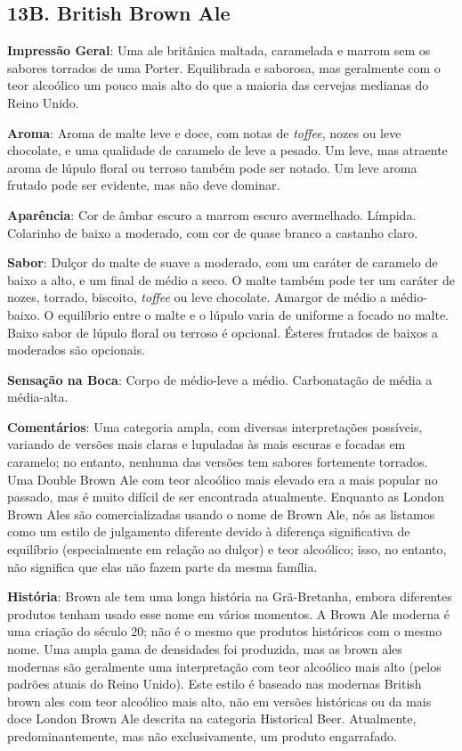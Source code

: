 \subsection*{13B. British Brown Ale}
\textbf{Impressão Geral}: Uma ale britânica maltada, caramelada e marrom sem os sabores torrados de uma Porter. Equilibrada e saborosa, mas geralmente com o teor alcoólico um pouco mais alto do que a maioria das cervejas medianas do Reino Unido.

\textbf{Aroma}: Aroma de malte leve e doce, com notas de \textit{toffee}, nozes ou leve chocolate, e uma qualidade de caramelo de leve a pesado. Um leve, mas atraente aroma de lúpulo floral ou terroso também pode ser notado. Um leve aroma frutado pode ser evidente, mas não deve dominar.

\textbf{Aparência}: Cor de âmbar escuro a marrom escuro avermelhado. Límpida. Colarinho de baixo a moderado, com cor de quase branco a castanho claro.

\textbf{Sabor}: Dulçor do malte de suave a moderado, com um caráter de caramelo de baixo a alto, e um final de médio a seco. O malte também pode ter um caráter de nozes, torrado, biscoito, \textit{toffee} ou leve chocolate. Amargor de médio a médio-baixo. O equilíbrio entre o malte e o lúpulo varia de uniforme a focado no malte. Baixo sabor de lúpulo floral ou terroso é opcional. Ésteres frutados de baixos a moderados são opcionais.

\textbf{Sensação na Boca}: Corpo de médio-leve a médio. Carbonatação de média a média-alta.

\textbf{Comentários}: Uma categoria ampla, com diversas interpretações possíveis, variando de versões mais claras e lupuladas às mais escuras e focadas em caramelo; no entanto, nenhuma das versões tem sabores fortemente torrados. Uma Double Brown Ale com teor alcoólico mais elevado era a mais popular no passado, mas é muito difícil de ser encontrada atualmente. Enquanto as London Brown Ales são comercializadas usando o nome de Brown Ale, nós as listamos como um estilo de julgamento diferente devido à diferença significativa de equilíbrio (especialmente em relação ao dulçor) e teor alcoólico; isso, no entanto, não significa que elas não fazem parte da mesma família.

\textbf{História}: Brown ale tem uma longa história na Grã-Bretanha, embora diferentes produtos tenham usado esse nome em vários momentos. A Brown Ale moderna é uma criação do século 20; não é o mesmo que produtos históricos com o mesmo nome. Uma ampla gama de densidades foi produzida, mas as brown ales modernas são geralmente uma interpretação com teor alcoólico mais alto (pelos padrões atuais do Reino Unido). Este estilo é baseado nas modernas British brown ales com teor alcoólico mais alto, não em versões históricas ou da mais doce London Brown Ale descrita na categoria Historical Beer. Atualmente, predominantemente, mas não exclusivamente, um produto engarrafado.

